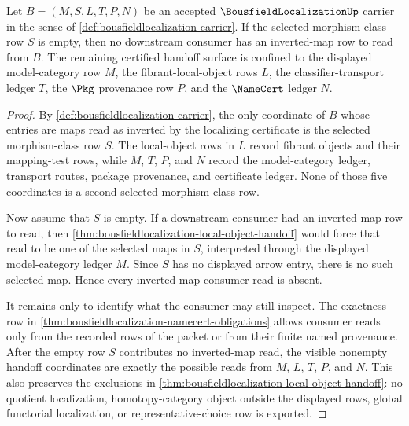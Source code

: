 \begin{theorem}
\label{thm:bousfieldlocalization-empty-selected-map-boundary}
Let $B=(M,S,L,T,P,N)$ be an accepted $\BousfieldLocalizationUp$ carrier in the sense of \autoref{def:bousfieldlocalization-carrier}. If the selected morphism-class row $S$ is empty, then no downstream consumer has an inverted-map row to read from $B$. The remaining certified handoff surface is confined to the displayed model-category row $M$, the fibrant-local-object rows $L$, the classifier-transport ledger $T$, the $\Pkg$ provenance row $P$, and the $\NameCert$ ledger $N$.
\end{theorem}
\begin{proof}
By \autoref{def:bousfieldlocalization-carrier}, the only coordinate of $B$ whose entries are maps read as inverted by the localizing certificate is the selected morphism-class row $S$. The local-object rows in $L$ record fibrant objects and their mapping-test rows, while $M$, $T$, $P$, and $N$ record the model-category ledger, transport routes, package provenance, and certificate ledger. None of those five coordinates is a second selected morphism-class row.

Now assume that $S$ is empty. If a downstream consumer had an inverted-map row to read, then \autoref{thm:bousfieldlocalization-local-object-handoff} would force that read to be one of the selected maps in $S$, interpreted through the displayed model-category ledger $M$. Since $S$ has no displayed arrow entry, there is no such selected map. Hence every inverted-map consumer read is absent.

It remains only to identify what the consumer may still inspect. The exactness row in \autoref{thm:bousfieldlocalization-namecert-obligations} allows consumer reads only from the recorded rows of the packet or from their finite named provenance. After the empty row $S$ contributes no inverted-map read, the visible nonempty handoff coordinates are exactly the possible reads from $M$, $L$, $T$, $P$, and $N$. This also preserves the exclusions in \autoref{thm:bousfieldlocalization-local-object-handoff}: no quotient localization, homotopy-category object outside the displayed rows, global functorial localization, or representative-choice row is exported.
\end{proof}


